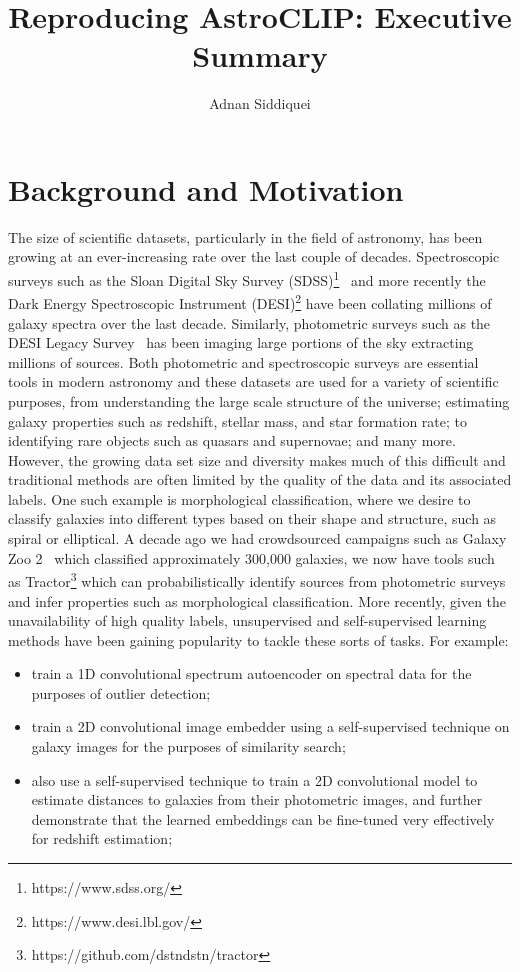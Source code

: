 \documentclass[a4paper,11pt]{article}
\title{\boldmath Reproducing AstroCLIP: Executive Summary}
\author{Adnan Siddiquei}
\affiliation{University of Cambridge}
\begin{document}

\maketitle
\flushbottom

\section{Background and Motivation}\label{sec:introduction}
The size of scientific datasets, particularly in the field of astronomy, has been growing at an ever-increasing rate
over the last couple of decades.
Spectroscopic surveys such as the Sloan Digital Sky Survey (SDSS)\footnote{https://www.sdss.org/}~\citep{york2000} and
more recently the Dark Energy Spectroscopic Instrument (DESI)\footnote{https://www.desi.lbl.gov/} have been collating millions of
galaxy spectra over the last decade.
Similarly, photometric surveys such as the DESI Legacy Survey~\citep{desilegacy2018} has been imaging large portions
of the sky extracting millions of sources.
Both photometric and spectroscopic surveys are essential tools in modern astronomy and these datasets are used for
a variety of scientific purposes, from understanding the large scale structure of the universe;
estimating galaxy properties such as redshift, stellar mass, and star formation rate; to identifying rare objects such as
quasars and supernovae; and many more.
However, the growing data set size and diversity makes much of this difficult and traditional methods are often
limited by the quality of the data and its associated labels.
One such example is morphological classification, where we desire to classify galaxies into different types based on their
shape and structure, such as spiral or elliptical.
A decade ago we had crowdsourced campaigns such as Galaxy Zoo 2~\citep{willet2013} which classified approximately
300,000 galaxies, we now have tools such as Tractor\footnote{https://github.com/dstndstn/tractor}
which can probabilistically identify sources from photometric surveys and infer properties such as morphological classification.
More recently, given the unavailability of high quality labels, unsupervised and self-supervised learning methods have been
gaining popularity to tackle these sorts of tasks.
For example:
\begin{itemize}
    \item \cite{liang2023} train a 1D convolutional spectrum autoencoder on spectral data for the purposes of outlier
    detection;
    \item \cite{stein2021} train a 2D convolutional image embedder using a self-supervised technique on galaxy images
    for the purposes of similarity search;
    \item \cite{hayat2021} also use a self-supervised technique to train a 2D convolutional model to estimate distances to galaxies from their
    photometric images, and further demonstrate that the learned embeddings can be fine-tuned very effectively for redshift estimation;
\end{itemize}
\end{document}

